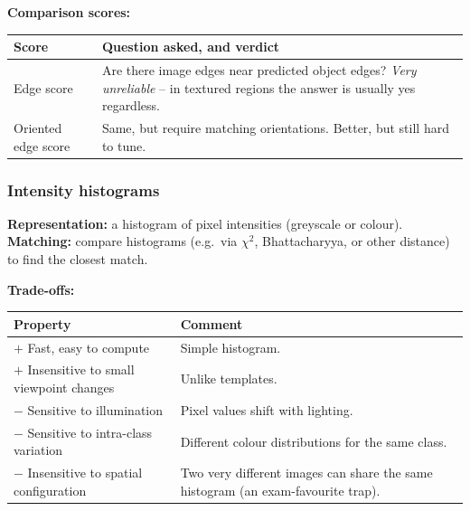 \textbf{Comparison scores:}

\begin{center}
\renewcommand{\arraystretch}{1.3}
\begin{tabular}{@{} l p{8cm} @{}}
\toprule
\textbf{Score} & \textbf{Question asked, and verdict} \\
\midrule
Edge score & Are there image edges near predicted object edges? \emph{Very unreliable} -- in textured regions the answer is usually yes regardless. \\
Oriented edge score & Same, but require matching orientations. Better, but still hard to tune. \\
\bottomrule
\end{tabular}
\end{center}

\bigseparator

\subsubsection{Intensity histograms}

\begin{defbox}
\textbf{Representation:} a histogram of pixel intensities (greyscale or colour). \\
\textbf{Matching:} compare histograms (e.g.\ via $\chi^2$, Bhattacharyya, or other distance) to find the closest match.
\end{defbox}

\textbf{Trade-offs:}

\begin{center}
\renewcommand{\arraystretch}{1.3}
\begin{tabular}{@{} l p{8cm} @{}}
\toprule
\textbf{Property} & \textbf{Comment} \\
\midrule
$+$ Fast, easy to compute & Simple histogram. \\
$+$ Insensitive to small viewpoint changes & Unlike templates. \\
$-$ Sensitive to illumination & Pixel values shift with lighting. \\
$-$ Sensitive to intra-class variation & Different colour distributions for the same class. \\
$-$ Insensitive to spatial configuration & Two very different images can share the same histogram (an exam-favourite trap). \\
\bottomrule
\end{tabular}
\end{center}

